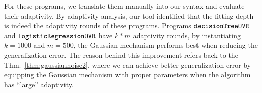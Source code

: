 For these programs, we translate them manually into our syntax and evaluate their adaptivity.
By adaptivity analysis, our tool identified that the fitting depth is indeed the adaptivity rounds of these programs.
Programs $\mathtt{decisionTreeOVR}$ and $\mathtt{logisticRegressionOVR}$ 
have $k*m$ adaptivity rounds, by instantiating $k = 1000$ and $m = 500$,
the Gaussian mechanism performs best when reducing the generalization error.
The reason behind this improvement refers back to the Thm.~\ref{thm:gaussiannoise2}, where
we can achieve better generalization error by equipping the Gaussian mechanism with proper parameters when the algorithm has ``large'' adaptivity.









